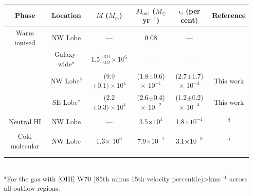 \begin{table}
	\renewcommand{\arraystretch}{1.5}
	\centering
	\begin{tabular}{cccccc}
	Phase          & Location        & $M$ ($M_\odot$)                                                   & $\dot{M}_\mathrm{out}$ ($M_\odot$\;yr$^{-1}$) & $\epsilon_\mathrm{f}$ (per cent)   & Reference                             \\ \hline
	Warm ionised   & NW Lobe         & ---                                                                & 0.08                                        & ---                                 & \citet{Morganti2007} \\
				& Galaxy-wide\;$^a$ & 1.5$^{+3.0}_{-0.9} \times 10^6$                                    & ---                                          & ---                                 & \citet{Venturi2021}  \\
				& NW Lobe\;$^b$     & (9.9$\pm0.1) \times 10^4$                                       & (1.8$\pm$0.6) $\times$ $10^{-1}$          & (2.7$\pm$1.7) $\times$ $10^{-3}$ & This work                             \\
				& SE Lobe\;$^c$     & (2.2$\pm0.3) \times 10^4$                                       & (2.6$\pm$0.4) $\times$ $10^{-2}$          & (1.2$\pm$0.2) $\times$ $10^{-4}$ & This work                             \\
		&	&	&	&	\\
	Neutral HI     & NW Lobe         & ---                                              & 3.5$\times10^1$                                          & 1.8$\times10^{-1}$                                  & \citet{Morganti2005}\;$^d$ \\ 
	&	&	&	&	\\
	Cold molecular & NW Lobe         & 1.3$\times$ $10^6$ & 7.9$\times10^{-1}$                                     & 3.1$\times10^{-3}$                          & \citet{Oosterloo2017}\;$^{d}$ \\ 
	&	&	&	&	\\
				&                 &                                                                   &                                             &                                    &                                      
	\end{tabular} \\
	$^a$For the gas with [OIII] W70 (85th minus 15th velocity percentile)\;\mbox{\textgreater{}\;km\;s$^{-1}$} across all outflow regions. \\

\end{table}
